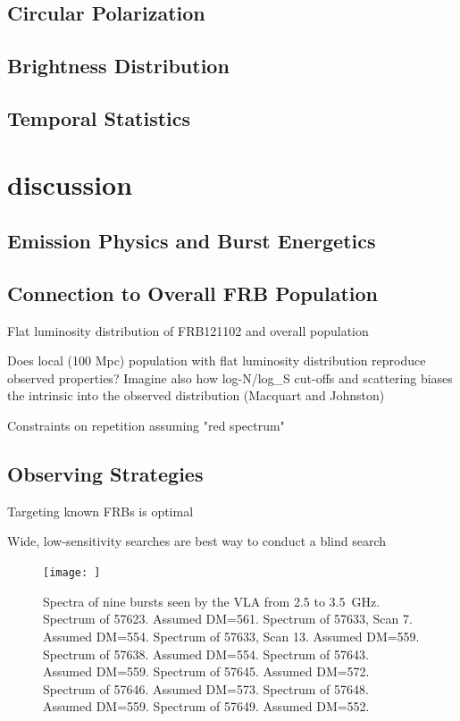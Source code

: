 \documentclass{emulateapj}
\begin{document}
\subsection{Circular Polarization}


\subsection{Brightness Distribution}



\subsection{Temporal Statistics}


\section{discussion}

\subsection{Emission Physics and Burst Energetics}



\subsection{Connection to Overall FRB Population}

Flat luminosity distribution of FRB121102 and overall population

Does local (100 Mpc) population with flat luminosity distribution reproduce observed properties? Imagine also how log-N/log_S cut-offs and scattering biases the intrinsic into the observed distribution (Macquart and Johnston)

Constraints on repetition assuming "red spectrum"

\subsection{Observing Strategies}

Targeting known FRBs is optimal

Wide, low-sensitivity searches are best way to conduct a blind search






\begin{figure}[htb]
\begin{center}
\texttt{[image: ]}
\caption{Spectra of nine bursts seen by the VLA from 2.5 to 3.5~GHz.
Spectrum of 57623. Assumed DM=561.
Spectrum of 57633, Scan 7. Assumed DM=554.
Spectrum of 57633, Scan 13. Assumed DM=559. 
Spectrum of 57638. Assumed DM=554.
Spectrum of 57643. Assumed DM=559.
Spectrum of 57645. Assumed DM=572.
Spectrum of 57646. Assumed DM=573.
Spectrum of 57648. Assumed DM=559.
Spectrum of 57649. Assumed DM=552.
\label{fig:name}}
\end{center}
\end{figure}
\end{document}
